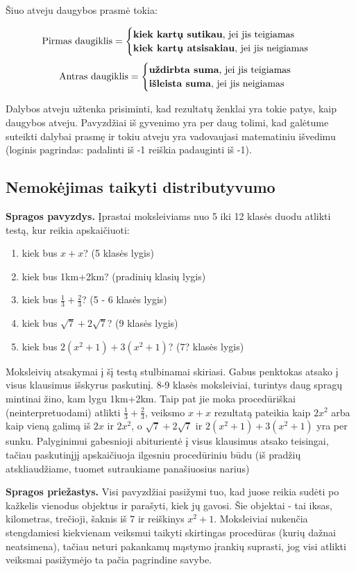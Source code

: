\documentclass[a4paper]{article}
\begin{document}
Šiuo atveju daugybos prasmė tokia:

$$\text{Pirmas daugiklis} = \begin{cases} \text{\textbf{kiek kartų sutikau}, jei jis teigiamas} \\ \text{\textbf{kiek kartų atsisakiau}, jei jis neigiamas}\end{cases}$$ $$\text{Antras daugiklis} = \begin{cases} \text{\textbf{uždirbta suma}, jei jis teigiamas} \\ \text{\textbf{išleista suma}, jei jis neigiamas}\end{cases}$$

Dalybos atveju užtenka prisiminti, kad rezultatų ženklai yra tokie patys, kaip daugybos atveju. Pavyzdžiai iš gyvenimo yra per daug tolimi, kad galėtume suteikti dalybai prasmę ir tokiu atveju yra vadovaujasi matematiniu išvedimu (loginis pagrindas: padalinti iš -1 reiškia padauginti iš -1).

\subsection*{Nemokėjimas taikyti distributyvumo}
\textbf{Spragos pavyzdys.} Įprastai moksleiviams nuo 5 iki 12 klasės duodu atlikti testą, kur reikia apskaičiuoti:
\begin{enumerate}
\item kiek bus $x+x$? (5 klasės lygis)
\item kiek bus 1km+2km? (pradinių klasių lygis)
\item kiek bus $\frac{1}{3}+\frac{2}{3}$? (5 - 6 klasės lygis)
\item kiek bus $\sqrt{7}+2\sqrt{7}$? (9 klasės lygis)
\item kiek bus $2(x^2+1)+3(x^2+1)$? (7? klasės lygis)
\end{enumerate}
Moksleivių atsakymai į šį testą stulbinamai skiriasi. Gabus penktokas atsako į visus klausimus išskyrus paskutinį.
8-9 klasės moksleiviai, turintys daug spragų mintinai žino, kam lygu 1km+2km. Taip pat jie moka procedūriškai (neinterpretuodami) atlikti $\frac{1}{3}+\frac{2}{3}$, veiksmo $x+x$ rezultatą pateikia kaip $2x^2$ arba kaip vieną galimą iš $2x$ ir $2x^2$, o $\sqrt{7}+2\sqrt{7}$ ir $2(x^2+1)+3(x^2+1)$ yra per sunku. Palyginimui gabesnioji abiturientė į visus klausimus atsako teisingai, tačiau paskutinįjį apskaičiuoja ilgesniu procedūriniu būdu (iš pradžių atskliaudžiame, tuomet sutraukiame panašiuosius narius)

\textbf{Spragos priežastys.} Visi pavyzdžiai pasižymi tuo, kad juose reikia sudėti po kažkelis vienodus objektus ir parašyti, kiek jų gavosi. Šie objektai - tai iksas, kilometras, trečioji, šaknis iš 7 ir reiškinys $x^2+1$. Moksleiviai nukenčia stengdamiesi kiekvienam veiksmui taikyti skirtingas procedūras (kurių dažnai neatsimena), tačiau neturi pakankamų mąstymo įrankių suprasti, jog visi atlikti veiksmai pasižymėjo ta pačia pagrindine savybe.  
\end{document}
